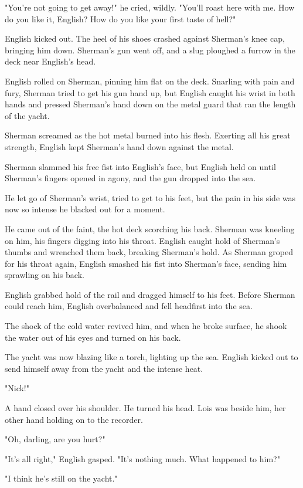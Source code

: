 \documentclass{novel}
\begin{document}
"You're not going to get away!" he cried, wildly. "You'll roast here with me. How do you like it, English? How do you like your first taste of hell?"

English kicked out. The heel of his shoes crashed against Sherman's knee cap, bringing him down. Sherman's gun went off, and a slug ploughed a furrow in the deck near English's head.

English rolled on Sherman, pinning him flat on the deck. Snarling with pain and fury, Sherman tried to get his gun hand up, but English caught his wrist in both hands and pressed Sherman's hand down on the metal guard that ran the length of the yacht.

Sherman screamed as the hot metal burned into his flesh. Exerting all his great strength, English kept Sherman's hand down against the metal.

Sherman slammed his free fist into English's face, but English held on until Sherman's fingers opened in agony, and the gun dropped into the sea.

He let go of Sherman's wrist, tried to get to his feet, but the pain in his side was now so intense he blacked out for a moment.

He came out of the faint, the hot deck scorching his back. Sherman was kneeling on him, his fingers digging into his throat. English caught hold of Sherman's thumbs and wrenched them back, breaking Sherman's hold. As Sherman groped for his throat again, English smashed his fist into Sherman's face, sending him sprawling on his back.

English grabbed hold of the rail and dragged himself to his feet. Before Sherman could reach him, English overbalanced and fell headfirst into the sea.

The shock of the cold water revived him, and when he broke surface, he shook the water out of his eyes and turned on his back.

The yacht was now blazing like a torch, lighting up the sea. English kicked out to send himself away from the yacht and the intense heat.

"Nick!"

A hand closed over his shoulder. He turned his head. Lois was beside him, her other hand holding on to the recorder.

"Oh, darling, are you hurt?"

"It's all right," English gasped. "It's nothing much. What happened to him?"

"I think he's still on the yacht."
\end{document}

